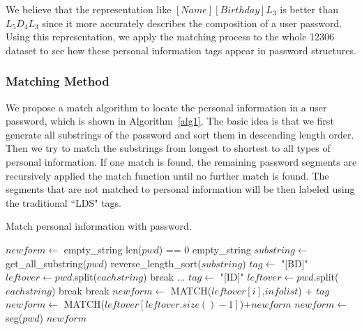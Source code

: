 We believe that the representation like $[Name][Birthday]L_3$ is better than $L_5D_4L_3$ since it more accurately describes the composition of a user password. Using this representation, we apply the matching process to the whole 12306 dataset to see how these personal information tags appear in password structures.

\subsubsection{Matching Method}
\label{matchingmethod}

We propose a match algorithm to locate the personal information in a user password, which is shown
 in Algorithm~\ref{alg1}. The basic idea is that we first generate all substrings of the password and sort them in descending length order. Then we try to match the substrings from longest to shortest to all types of personal information. If one match is found, the remaining password segments are recursively applied the match function until no further match is found. The segments that are not matched to personal information will be then labeled using the traditional ``LDS" tags.


\begin{algorithm}[h!]
\caption{Match personal information with password.}
\label{alg1}
\begin{algorithmic}[1]
\State $newform \gets$ empty\_string
\If len($pwd$) == 0
\State \Return empty\_string
\EndIf
\State $substring \gets$ get\_all\_substring($pwd$)
\State reverse\_length\_sort($substring$)
\State $tag \gets $ "[BD]"
\State $leftover \gets pwd$.split($eachstring$)
\State break
\EndIf
\State $\ldots$
\State $tag \gets$ "[ID]"
\State $leftover \gets pwd$.split($eachstring$)
\State break
\EndIf
\Else
\State break
\EndIf
\EndFor
{}
\State $newform \gets$ MATCH($leftover[i]$,$infolist$) + $tag$
\EndFor
\State $newform \gets$  MATCH($leftover[leftover.size()-1]$)+$newform$
\Else
\State $newform \gets$ seg($pwd$)
\EndIf
\State \Return $newform$
\EndProcedure
\end{algorithmic}
\end{algorithm}

